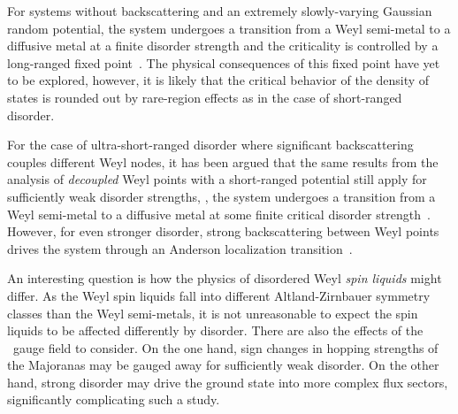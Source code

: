 For systems without backscattering and an extremely slowly-varying Gaussian random potential, the system undergoes a transition from a Weyl semi-metal to a diffusive metal at a finite disorder strength and the criticality is controlled by a long-ranged fixed point~\cite{LouvetPRB2017}.
The physical consequences of this fixed point have yet to be explored, however, it is likely that the critical behavior of the density of states is rounded out by rare-region effects as in the case of short-ranged disorder.

For the case of ultra-short-ranged disorder where significant backscattering couples different Weyl nodes, it has been argued that the same results from the analysis of \textit{decoupled} Weyl points with a short-ranged potential still apply for sufficiently weak disorder strengths, \ie, the system undergoes a transition from a Weyl semi-metal to a diffusive metal at some finite critical disorder strength~\cite{PixleyPRB2017}.
However, for even stronger disorder, strong backscattering between Weyl points drives the system through an Anderson localization transition~\cite{PixleyPRL2015}.

An interesting question is how the physics of disordered Weyl \textit{spin liquids} might differ.
As the Weyl spin liquids fall into different Altland-Zirnbauer symmetry classes than the Weyl semi-metals, it is not unreasonable to expect the spin liquids to be affected differently by disorder.
There are also the effects of the \ZZ~gauge field to consider.
On the one hand, sign changes in hopping strengths of the Majoranas may be gauged away for sufficiently weak disorder.
On the other hand, strong disorder may drive the ground state into more complex flux sectors, significantly complicating such a study.